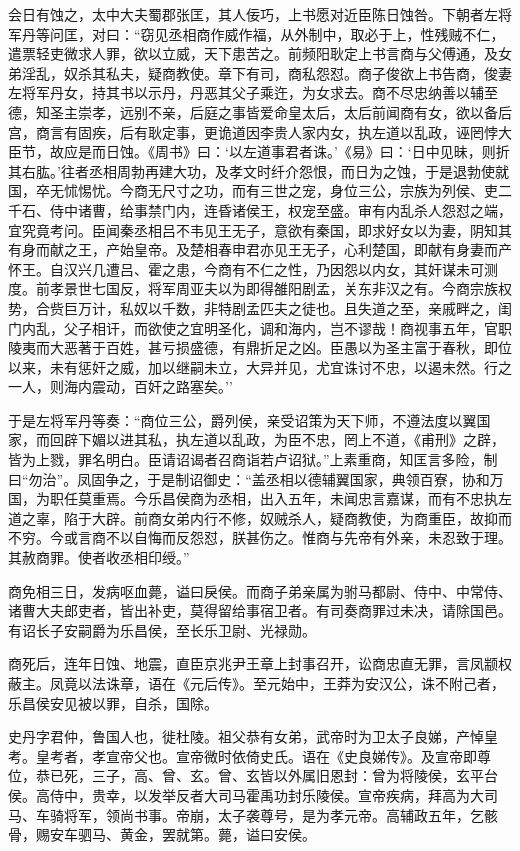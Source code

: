\documentclass[]{article}
\begin{document}
会日有蚀之，太中大夫蜀郡张匡，其人佞巧，上书愿对近臣陈日蚀咎。下朝者左将军丹等问匡，对曰：``窃见丞相商作威作福，从外制中，取必于上，性残贼不仁，遣票轻吏微求人罪，欲以立威，天下患苦之。前频阳耿定上书言商与父傅通，及女弟淫乱，奴杀其私夫，疑商教使。章下有司，商私怨怼。商子俊欲上书告商，俊妻左将军丹女，持其书以示丹，丹恶其父子乘迕，为女求去。商不尽忠纳善以辅至德，知圣主崇孝，远别不亲，后庭之事皆爱命皇太后，太后前闻商有女，欲以备后宫，商言有固疾，后有耿定事，更诡道因李贵人家内女，执左道以乱政，诬罔悖大臣节，故应是而日蚀。《周书》曰：`以左道事君者诛。'《易》曰：`日中见昧，则折其右肱。'往者丞相周勃再建大功，及孝文时纤介怨恨，而日为之蚀，于是退勃使就国，卒无怵惕忧。今商无尺寸之功，而有三世之宠，身位三公，宗族为列侯、吏二千石、侍中诸曹，给事禁门内，连昏诸侯王，权宠至盛。审有内乱杀人怨怼之端，宜究竟考问。臣闻秦丞相吕不韦见王无子，意欲有秦国，即求好女以为妻，阴知其有身而献之王，产始皇帝。及楚相春申君亦见王无子，心利楚国，即献有身妻而产怀王。自汉兴几遭吕、霍之患，今商有不仁之性，乃因怨以内女，其奸谋未可测度。前孝景世七国反，将军周亚夫以为即得雒阳剧孟，关东非汉之有。今商宗族权势，合赀巨万计，私奴以千数，非特剧孟匹夫之徒也。且失道之至，亲戚畔之，闺门内乱，父子相讦，而欲使之宜明圣化，调和海内，岂不谬哉！商视事五年，官职陵夷而大恶著于百姓，甚亏损盛德，有鼎折足之凶。臣愚以为圣主富于春秋，即位以来，未有惩奸之威，加以继嗣未立，大异并见，尤宜诛讨不忠，以遏未然。行之一人，则海内震动，百奸之路塞矣。''

于是左将军丹等奏：``商位三公，爵列侯，亲受诏策为天下师，不遵法度以翼国家，而回辟下媚以进其私，执左道以乱政，为臣不忠，罔上不道，《甫刑》之辟，皆为上戮，罪名明白。臣请诏谒者召商诣若卢诏狱。''上素重商，知匡言多险，制曰``勿治''。凤固争之，于是制诏御史：``盖丞相以德辅翼国家，典领百寮，协和万国，为职任莫重焉。今乐昌侯商为丞相，出入五年，未闻忠言嘉谋，而有不忠执左道之辜，陷于大辟。前商女弟内行不修，奴贼杀人，疑商教使，为商重臣，故抑而不穷。今或言商不以自悔而反怨怼，朕甚伤之。惟商与先帝有外亲，未忍致于理。其赦商罪。使者收丞相印绶。''

商免相三日，发病呕血薨，谥曰戾侯。而商子弟亲属为驸马都尉、侍中、中常侍、诸曹大夫郎吏者，皆出补吏，莫得留给事宿卫者。有司奏商罪过未决，请除国邑。有诏长子安嗣爵为乐昌侯，至长乐卫尉、光禄勋。

商死后，连年日蚀、地震，直臣京兆尹王章上封事召开，讼商忠直无罪，言凤颛权蔽主。凤竟以法诛章，语在《元后传》。至元始中，王莽为安汉公，诛不附己者，乐昌侯安见被以罪，自杀，国除。

史丹字君仲，鲁国人也，徙杜陵。祖父恭有女弟，武帝时为卫太子良娣，产悼皇考。皇考者，孝宣帝父也。宣帝微时依倚史氏。语在《史良娣传》。及宣帝即尊位，恭已死，三子，高、曾、玄。曾、玄皆以外属旧恩封：曾为将陵侯，玄平台侯。高侍中，贵幸，以发举反者大司马霍禹功封乐陵侯。宣帝疾病，拜高为大司马、车骑将军，领尚书事。帝崩，太子袭尊号，是为孝元帝。高辅政五年，乞骸骨，赐安车驷马、黄金，罢就第。薨，谥曰安侯。
\end{document}

